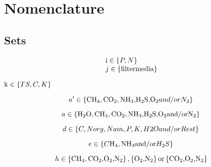 \documentclass[10pt,a4paper]{article}
\begin{document}
\section{Nomenclature}
\subsection{Sets}
\[\begin{array}{l}{\rm{i}} \in \left\{ {P,N} \right\}{\rm{   }}\\j \in \left\{ {{\rm{filter media}}} \right\}\end{array}\]

\({\rm{k}} \in \left\{ {TS,C,K} \right\}{\rm{ }}\)

\[a' \in \left\{ {{\rm{C}}{{\rm{H}}_{\rm{4}}}{\rm{, C}}{{\rm{O}}_{\rm{2}}}{\rm{, N}}{{\rm{H}}_{\rm{3}}}{\rm{, }}{{\rm{H}}_{\rm{2}}}{\rm{S,}}{{\rm{O}}_{\rm{2}}}{\rm{ }}and{\rm{/}}or{\rm{ }}{N_2}} \right\}{\rm{ }}\]

\[a \in \left\{ {{{\rm{H}}_{\rm{2}}}{\rm{O, C}}{{\rm{H}}_{\rm{4}}}{\rm{, C}}{{\rm{O}}_{\rm{2}}}{\rm{, N}}{{\rm{H}}_{\rm{3}}}{\rm{, }}{{\rm{H}}_{\rm{2}}}{\rm{S, }}{{\rm{O}}_{\rm{2}}}{\rm{ and/or }}{{\rm{N}}_{\rm{2}}}} \right\}{\rm{ }}\]

\[d \in \left\{ {C,{\rm{ }}Norg,{\rm{ }}Nam,{\rm{ }}P,{\rm{ }}K,{\rm{ }}H2O{\rm{ }}and{\rm{/}}or{\rm{ }}Rest} \right\}{\rm{ }}\]

\[e \in \left\{ {C{{\rm{H}}_{\rm{4}}}{\rm{, N}}{{\rm{H}}_{\rm{3}}}{\rm{ and/or }}{H_2}S} \right\}{\rm{ }}\]

\[h \in \left\{ {{\rm{C}}{{\rm{H}}_{\rm{4}}}{\rm{, C}}{{\rm{O}}_{\rm{2}}}{\rm{, }}{{\rm{O}}_{\rm{2}}}{\rm{, }}{{\rm{N}}_{\rm{2}}}} \right\}{\rm{,}}\left\{ {{{\rm{O}}_{\rm{2}}}{\rm{, }}{{\rm{N}}_{\rm{2}}}} \right\}{\rm{ or }}\left\{ {{\rm{C}}{{\rm{O}}_{\rm{2}}}{\rm{,}}{{\rm{O}}_{\rm{2}}}{\rm{, }}{{\rm{N}}_{\rm{2}}}} \right\}\]
\end{document}
